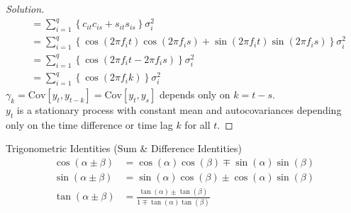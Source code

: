 \documentclass[UTF8,a4paper,14pt]{ctexart}
\newcommand{\Cov}{\mathrm{Cov}}
\newenvironment{solution}
  {\renewcommand\qedsymbol{$\blacksquare$}\begin{proof}[Solution]}
  {\end{proof}}
\theoremstyle{definition}
\theoremstyle{remark}
\begin{document}
\begin{solution}
\begin{align*}
        &=\sum_{i=1}^q  \left\{ c_{it}c_{is}+s_{it}s_{is}\right\}\sigma_i^2 \\
        &=\sum_{i=1}^q  \left\{  \cos(2\pi f_i t) \cos(2\pi f_i s)+ \sin(2\pi f_i t) \sin(2\pi f_i s)\right\}\sigma_i^2 \\
        &=\sum_{i=1}^q  \left\{  \cos(2\pi f_i t-2\pi f_i s) \right\}\sigma_i^2 \\
        &=\sum_{i=1}^q  \left\{  \cos(2\pi f_i k) \right\}\sigma_i^2 
    \end{align*}
    \(\gamma_k = \Cov[y_t, y_{t-k}]=\Cov[y_t, y_s]\) depends only on $k = t - s$.\\
    $y_t$ is a stationary process with constant mean and autocovariances depending only on the time difference or time lag $k$ for all $t$.

\end{solution}
\begin{mybox}{Trigonometric Identities (Sum \& Difference Identities)}
    \begin{align*}
        \cos(\alpha\pm \beta) &= \cos(\alpha)\cos(\beta)\mp \sin(\alpha)\sin(\beta)\\
        \sin(\alpha\pm \beta) &= \sin(\alpha)\cos(\beta)\pm \cos(\alpha)\sin(\beta)\\
        \tan(\alpha\pm \beta) &=\frac{\tan(\alpha)\pm\tan(\beta)}{1\mp\tan(\alpha)\tan(\beta)}
    \end{align*}

\end{mybox}
\end{document}

